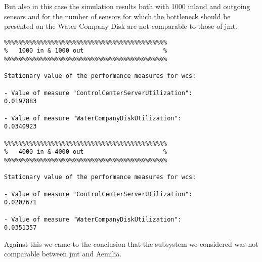 \begin{center}
\end{center}
\bigskip
{}
\bigskip

But also in this case the simulation results both with 1000 inland and outgoing sensors and for the number of sensors for which the bottleneck should be presented on the Water Company Disk are not comparable to those of jmt.\\

\begin{lstlisting}
%%%%%%%%%%%%%%%%%%%%%%%%%%%%%%%%%%%%%%%%%%%%%
%	1000 in & 1000 out						%
%%%%%%%%%%%%%%%%%%%%%%%%%%%%%%%%%%%%%%%%%%%%%

Stationary value of the performance measures for wcs:

- Value of measure "ControlCenterServerUtilization":
0.0197883

- Value of measure "WaterCompanyDiskUtilization":
0.0340923

%%%%%%%%%%%%%%%%%%%%%%%%%%%%%%%%%%%%%%%%%%%%%
%	4000 in & 4000 out						%
%%%%%%%%%%%%%%%%%%%%%%%%%%%%%%%%%%%%%%%%%%%%%

Stationary value of the performance measures for wcs:

- Value of measure "ControlCenterServerUtilization":
0.0207671

- Value of measure "WaterCompanyDiskUtilization":
0.0351357
\end{lstlisting}


Against this we came to the conclusion that the subsystem we considered was not comparable between jmt and Aemilia.